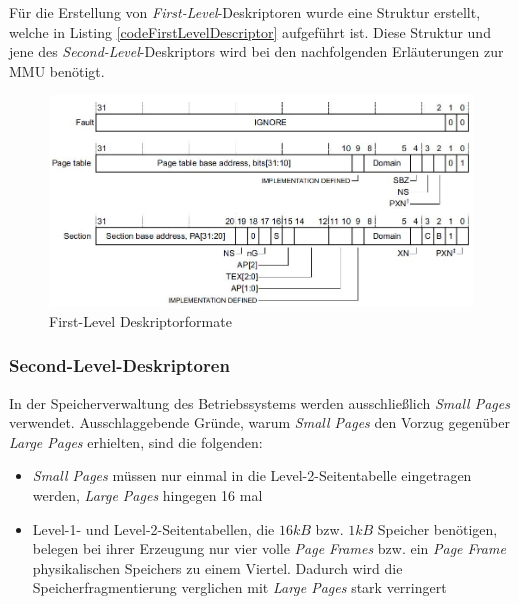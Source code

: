 Für die Erstellung von \textit{First-Level}-Deskriptoren wurde eine Struktur erstellt, welche in Listing \ref{codeFirstLevelDescriptor} aufgeführt ist. Diese Struktur und jene des \textit{Second-Level}-Deskriptors wird bei den nachfolgenden Erläuterungen zur \ac{MMU} benötigt.\\

\begin{figure}[H]
	\includegraphics[scale=0.7]{chapters/mmu/figures/firstLevelDescriptor}
	\caption{First-Level Deskriptorformate \cite[S. B3-1326]{ARM:ARM}}
	\label{fig:firstLevelDescriptor}
\end{figure}




\subsubsection*{Second-Level-Deskriptoren}

In der Speicherverwaltung des Betriebssystems werden ausschließlich \textit{Small Pages} verwendet. Ausschlaggebende Gründe, warum \textit{Small Pages} den Vorzug gegenüber \textit{Large Pages} erhielten, sind die folgenden:

\begin{itemize}
	\item \textit{Small Pages} müssen nur einmal in die Level-2-Seitentabelle eingetragen werden, \textit{Large Pages} hingegen 16 mal
	\item Level-1- und Level-2-Seitentabellen, die $16kB$ bzw. $1kB$ Speicher benötigen, belegen bei ihrer Erzeugung nur vier volle \textit{Page Frames} bzw. ein \textit{Page Frame} physikalischen Speichers zu einem Viertel. Dadurch wird die Speicherfragmentierung verglichen mit \textit{Large Pages} stark verringert
\end{itemize}

